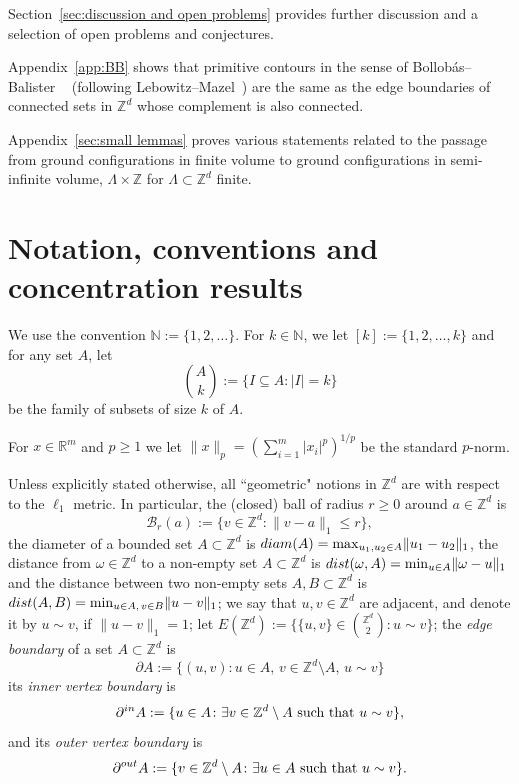 \documentclass[11pt, reqno]{amsart}
\newcommand{\N}{\mathbb{N}}
\newcommand{\Z}{\mathbb{Z}}
\newcommand{\R}{\mathbb{R}}
\numberwithin{equation}{section}
\begin{document}
Section~\ref{sec:discussion and open problems} provides further discussion and a selection of open problems and conjectures.

Appendix~\ref{app:BB} shows that primitive contours in the sense of Bollob\'as--Balister ~\cite{BB} (following Lebowitz--Mazel~\cite{LM}) are the same as the edge boundaries of connected sets in $\Z^d$ whose complement is also connected.

Appendix~\ref{sec:small lemmas} proves various statements related to the passage from ground configurations in finite volume to ground configurations in semi-infinite volume, $\Lambda\times\Z$ for $\Lambda\subset\Z^d$ finite.
\section{Notation, conventions and concentration results}
\label{sec:notation}

We use the convention $\N:=\{1,2,\ldots\}$. 
For $k\in\N$, we let $[k]:=\{1,2,\ldots, k\}$ and for any set $A$, let
\begin{equation*}
\binom{A}{k} := \{I\subseteq A \colon |I|=k\}
\end{equation*}
be the family of subsets of size $k$ of $A$.

For $x \in \R^m$ and $p\ge 1$ we let
$\lVert x \rVert_{p}= (\sum_{i=1}^{m}|x_i|^p)^{1/p}$ be the standard $p$-norm.

Unless explicitly stated otherwise, 
all ``geometric" notions in ${\mathbb Z}^d$ are with respect to the $\ell_1$ metric. In particular, the (closed) ball of radius $r\geq0$ around $a\in{\mathbb Z}^d$ is 
$$
{\mathcal B}_r(a):=\{v\in{\mathbb Z}^d\colon  \lVert v-a\rVert_1\leq r\},
$$
the diameter of a bounded set $A\subset {\mathbb Z}^d$ is ${\rm diam}(A)=\max_{u_1,u_2\in A}\lVert u_1-u_2\rVert_1$, the distance from $\omega\in{\mathbb Z}^d$ to a non-empty set $A\subset{\mathbb Z}^d$ is ${\rm dist}(\omega,A)=\min_{u\in A}\lVert \omega-u\rVert_1$ and the distance between two non-empty sets $A,B\subset {\mathbb Z}^d$ is ${\rm dist}(A,B)=\min_{u\in A,\,v\in B}\lVert u-v\rVert_1$;
we say that $u,v\in{\mathbb Z}^d$ are adjacent, and denote it by $u\sim v$, if $\lVert u-v\rVert_1=1$;
let $E({\mathbb Z}^d):=\{\{u,v\}\in\binom{{\mathbb Z}^d}{2}\colon u\sim v\}$;
the \emph{edge boundary} of a 
set $A\subset{\mathbb Z}^d$ is 
$$
\partial A:=\{(u,v)\colon u\in A,\, v\in {\mathbb Z}^d\setminus A,\, u\sim v\}
$$
its \emph{inner vertex boundary} is
$$
\partial^{\rm in} A:=\{u\in A \colon \exists v\in {\mathbb Z}^d\setminus A \text{ such that }  u\sim v\},
$$
and its \emph{outer vertex boundary} is
$$
\partial^{\rm out} A:=\{v\in \Z^d\setminus A \colon \exists u\in A \text{ such that }  u\sim v\}.
$$
\end{document}

